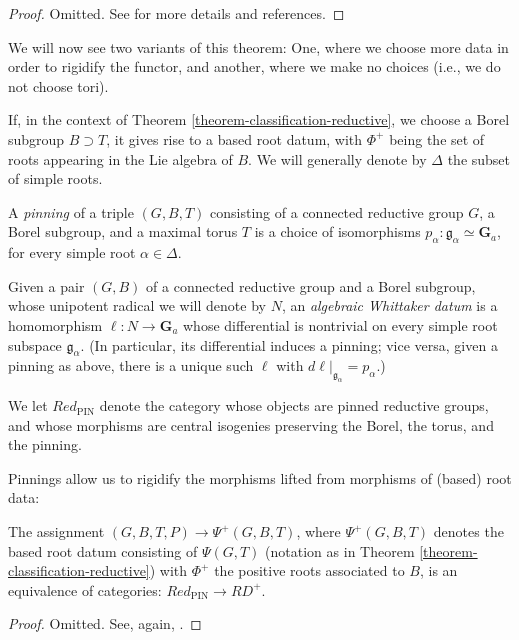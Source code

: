 \begin{proof}
 Omitted. See \cite{Springer-Corvallis} for more details and references.
\end{proof}




We will now see two variants of this theorem: One, where we choose more data in order to rigidify the functor, and another, where we make no choices (i.e., we do not choose tori).


If, in the context of Theorem \ref{theorem-classification-reductive}, we choose a Borel subgroup $B\supset T$, it gives rise to a based root datum, with $\Phi^+$ being the set of roots appearing in the Lie algebra of $B$. We will generally denote by $\Delta$ the subset of simple roots.

\begin{definition}
 \label{definition-pinning}
A {\it pinning} of a triple $(G, B, T)$ consisting of a connected reductive group $G$, a Borel subgroup,  and a maximal torus $T$ is a choice of isomorphisms $p_\alpha:\mathfrak g_\alpha \simeq \mathbf G_a$, for every simple root $\alpha\in \Delta$.

Given a pair $(G,B)$ of a connected reductive group and a Borel subgroup, whose unipotent radical we will denote by $N$, an {\it algebraic Whittaker datum} is a homomorphism $\ell:N\to \mathbf G_a$ whose differential is nontrivial on every simple root subspace $\mathfrak g_\alpha$. (In particular, its differential induces a pinning; vice versa, given a pinning as above, there is a unique such $\ell$ with $d\ell|_{\mathfrak g_\alpha} = p_\alpha$.)

We let $Red_{\text{PIN}}$ denote the category whose objects are pinned reductive groups, and whose morphisms are central isogenies preserving the Borel, the torus, and the pinning.
\end{definition}

Pinnings allow us to rigidify the morphisms lifted from morphisms of (based) root data:

\begin{theorem}
\label{theorem-classification-with-pinning}
The assignment $(G, B, T, P) \to \Psi^+(G,B,T)$, where $\Psi^+(G,B,T)$ denotes the based root datum consisting of $\Psi(G,T)$ (notation as in Theorem \ref{theorem-classification-reductive}) with $\Phi^+$ the positive roots associated to $B$, is an equivalence of categories: $Red_{\text{PIN}}\to RD^+$.
\end{theorem}

\begin{proof}
 Omitted. See, again, \cite{Springer-Corvallis}. 
\end{proof}


